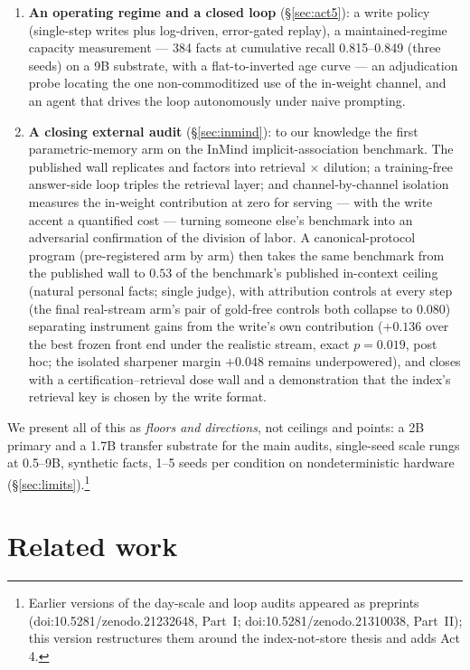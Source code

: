 \documentclass[11pt]{article}
\begin{document}
\begin{enumerate}
upstream, log as truth store, adapter as recognition organ over \emph{external} content.
\item \textbf{An operating regime and a closed loop} (\S\ref{sec:act5}): a write policy
(single-step writes plus log-driven, error-gated replay), a maintained-regime capacity
measurement --- 384 facts at cumulative recall 0.815--0.849 (three seeds) on a 9B substrate, with a
flat-to-inverted age curve --- an adjudication probe locating the one non-commoditized use of
the in-weight channel, and an agent that drives the loop autonomously under naive prompting.
\item \textbf{A closing external audit} (\S\ref{sec:inmind}): to our knowledge the first parametric-memory arm
on the InMind implicit-association benchmark. The published wall replicates and factors into
retrieval $\times$ dilution; a training-free answer-side loop triples the retrieval layer;
and channel-by-channel isolation measures the in-weight contribution at zero for serving ---
with the write accent a quantified cost --- turning someone else's benchmark into an
adversarial confirmation of the division of labor. A canonical-protocol program
(pre-registered arm by arm) then takes the same benchmark from the published wall to $0.53$
of the benchmark's published in-context ceiling (natural personal facts; single judge),
with attribution controls at every step (the final real-stream arm's pair of gold-free
controls both collapse to $0.080$) separating instrument gains from the
write's own contribution ($+0.136$ over the best frozen front end under the realistic
stream, exact $p{=}0.019$, post hoc; the isolated sharpener margin $+0.048$ remains
underpowered), and closes with a certification--retrieval
dose wall and a demonstration that the index's retrieval key is chosen by the write format.
\end{enumerate}

We present all of this as \emph{floors and directions}, not ceilings and points: a 2B primary
and a 1.7B transfer substrate for the main audits, single-seed scale rungs at 0.5--9B, synthetic
facts, 1--5 seeds per condition on nondeterministic hardware
(\S\ref{sec:limits}).\footnote{Earlier versions of the day-scale and loop audits appeared as
preprints (doi:10.5281/zenodo.21232648, Part~I; doi:10.5281/zenodo.21310038, Part~II); this version restructures them around the index-not-store thesis
and adds Act 4.}

\section{Related work}\label{sec:related}
\end{document}
